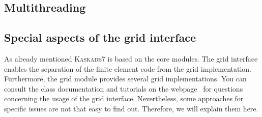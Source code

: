 \documentclass[11pt]{article}
\newcommand{\K}{\textsc{Kaskade7 }}
\begin{document}
\subsection{Multithreading}\label{threads}

\subsection{Special aspects of the \dune grid interface}
As already mentioned \K is based on the \dune core modules. The \dune grid interface enables the separation of the finite element code from the grid implementation. Furthermore, the \dune grid module provides several grid implementations. You can consult the class documentation and tutorials on the \dune webpage~\cite{dune} for questions concerning the usage of the grid interface. Nevertheless, some approaches for specific issues are not that easy to find out. Therefore, we will explain them here.
\end{document}
